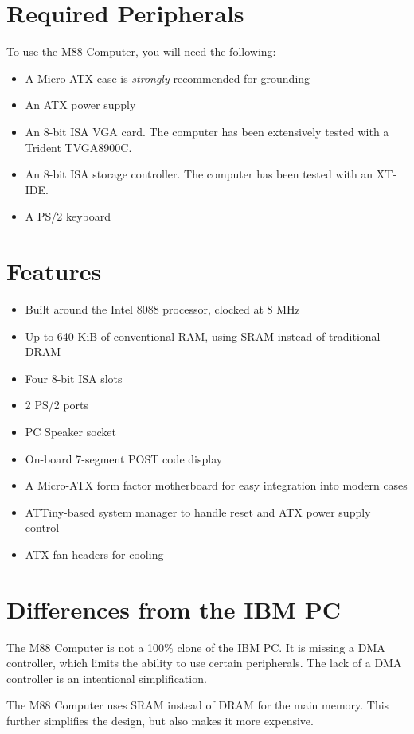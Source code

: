 \documentclass[twoside,10pt,letterpaper]{refart}
\begin{document}
\section{Required Peripherals}
To use the {\codefamily M88} Computer, you will need the following:
\begin{itemize}
    \item A Micro-ATX case is \emph{strongly} recommended for grounding
    \item An ATX power supply
    \item An 8-bit ISA VGA card. The computer has been extensively tested with a Trident TVGA8900C.
    \item An 8-bit ISA storage controller. The computer has been tested with an XT-IDE.
    \item A PS/2 keyboard
\end{itemize}

\section{Features}
\begin{itemize}
    \item Built around the Intel 8088 processor, clocked at 8 MHz
    \item Up to 640 KiB of conventional RAM, using SRAM instead of traditional DRAM
    \item Four 8-bit ISA slots
    \item 2 PS/2 ports
    \item PC Speaker socket
    \item On-board 7-segment POST code display
    \item A Micro-ATX form factor motherboard for easy integration into modern cases
    \item ATTiny-based system manager to handle reset and ATX power supply control
    \item ATX fan headers for cooling
\end{itemize}

\section{Differences from the IBM PC}
The {\codefamily M88} Computer is not a 100\% clone of the IBM PC. It is missing a
DMA controller, which limits the ability to use certain peripherals. The lack of a
DMA controller is an intentional simplification.

The {\codefamily M88} Computer uses SRAM instead of DRAM for the main memory. This
further simplifies the design, but also makes it more expensive.
\end{document}
